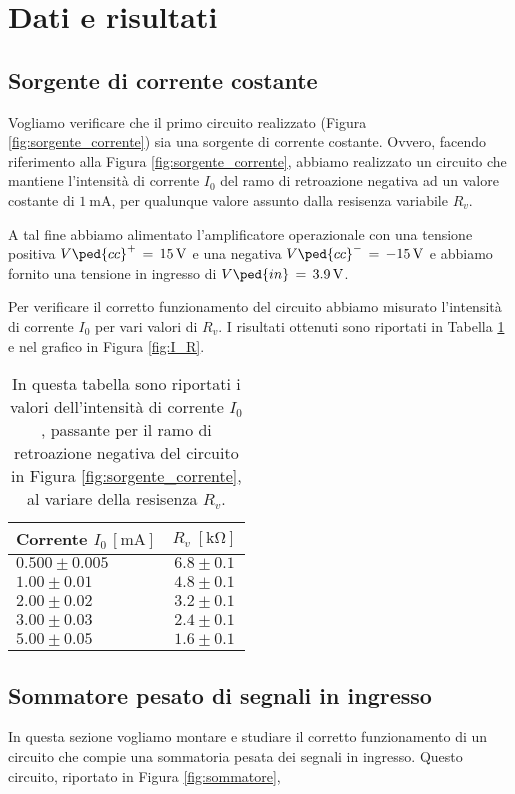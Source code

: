 \section*{Dati e risultati}

\subsection*{Sorgente di corrente costante}

Vogliamo verificare che il primo circuito realizzato (Figura \ref{fig:sorgente_corrente}) sia una sorgente di corrente costante. Ovvero, facendo riferimento alla Figura \ref{fig:sorgente_corrente}, abbiamo realizzato un circuito che mantiene l'intensità di corrente $I_0$ del ramo di retroazione negativa ad un valore costante di $\SI{1}{\milli\ampere}$, per qualunque valore assunto dalla resisenza variabile $R_v$.

A tal fine abbiamo alimentato l'amplificatore operazionale con una tensione positiva $V\ped{cc}^+\,=\,\SI{+15}{\volt}$ e una negativa $V\ped{cc}^-\,=\,\SI{-15}{\volt}$ e abbiamo fornito una tensione in ingresso di $V\ped{in}\,=\,\SI{+3.9}{\volt}$.

Per verificare il corretto funzionamento del circuito abbiamo misurato l'intensità di corrente $I_0$ per vari valori di $R_v$. I risultati ottenuti sono riportati in Tabella \ref{tab:corr_res} e nel grafico in Figura \ref{fig:I_R}.


\begin{table}[H]
    \centering
    \small
    \begin{tabular}{l c}
        \toprule
		Corrente $I_0 \, [\si{\milli\ampere}]$ & $R_v \; [\si{\kilo\ohm}]$ \\
        \midrule
		$ 0.500 \pm 0.005 $ & $6.8 \pm 0.1$ \\
		$ 1.00 \pm 0.01 $ & $ 4.8 \pm 0.1$ \\
		$ 2.00 \pm 0.02 $ & $ 3.2 \pm 0.1$ \\
		$ 3.00 \pm 0.03 $ & $ 2.4 \pm 0.1$ \\
		$ 5.00 \pm 0.05 $ & $ 1.6 \pm 0.1$ \\
        \bottomrule
    \end{tabular}
    \caption{In questa tabella sono riportati i valori dell'intensità di corrente $I_0$, passante per il ramo di retroazione negativa del circuito in Figura \ref{fig:sorgente_corrente}, al variare della resisenza $R_v$. }
    \label{tab:corr_res}
\end{table}

\subsection*{Sommatore pesato di segnali in ingresso}

In questa sezione vogliamo montare e studiare il corretto funzionamento di un circuito che compie una sommatoria pesata dei segnali in ingresso. Questo circuito, riportato in Figura \ref{fig:sommatore}, 











